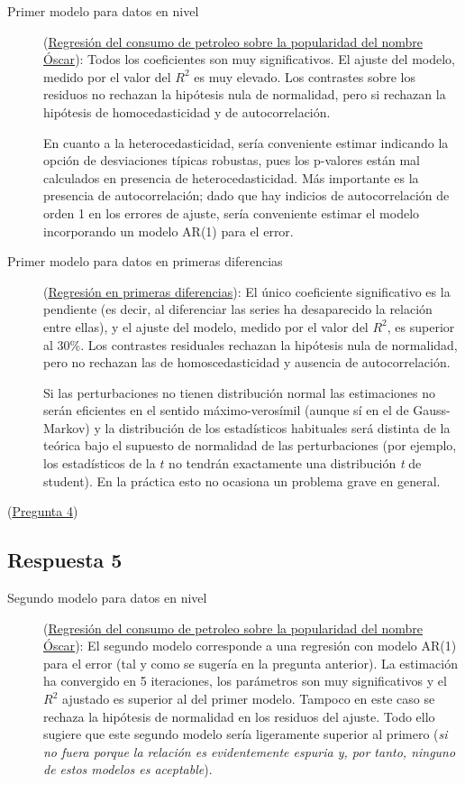 \documentclass[10pt]{article}
\begin{document}
\begin{description}
\item[{Primer modelo para datos en nivel}] (\hyperref[sec:orgd2adbd9]{Regresión del consumo de petroleo sobre la popularidad del nombre Óscar}): Todos los
coeficientes son muy significativos. El ajuste del modelo, medido
por el valor del \(R^2\) es muy elevado. Los contrastes sobre los
residuos no rechazan la hipótesis nula de normalidad, pero si
rechazan la hipótesis de homocedasticidad y de autocorrelación.

En cuanto a la heterocedasticidad, sería conveniente estimar
indicando la opción de desviaciones típicas robustas, pues los
p-valores están mal calculados en presencia de
heterocedasticidad. Más importante es la presencia de
autocorrelación; dado que hay indicios de autocorrelación de orden 1
en los errores de ajuste, sería conveniente estimar el modelo
incorporando un modelo AR(1) para el error.

\item[{Primer modelo para datos en primeras diferencias}] (\hyperref[sec:orge20fc9f]{Regresión en primeras diferencias}): El único coeficiente significativo es la
pendiente (es decir, al diferenciar las series ha desaparecido la
relación entre ellas), y el ajuste del modelo, medido por el valor
del \(R^2\), es superior al 30\%. Los contrastes residuales rechazan
la hipótesis nula de normalidad, pero no rechazan las de
homoscedasticidad y ausencia de autocorrelación.

Si las perturbaciones no tienen distribución normal las estimaciones
no serán eficientes en el sentido máximo-verosímil (aunque sí en el
de Gauss-Markov) y la distribución de los estadísticos habituales
será distinta de la teórica bajo el supuesto de normalidad de las
perturbaciones (por ejemplo, los estadísticos de la \(t\) no tendrán
exactamente una distribución \emph{t} de student). En la práctica esto no
ocasiona un problema grave en general.
\end{description}

(\hyperref[sec:org8e2fed6]{Pregunta 4})
\subsection*{Respuesta 5}
\label{sec:orgfe4b59b}


\begin{description}
\item[{Segundo modelo para datos en nivel}] (\hyperref[sec:orgd2adbd9]{Regresión del consumo de petroleo sobre la popularidad del nombre Óscar}): El segundo modelo
corresponde a una regresión con modelo AR(1) para el error (tal y
como se sugería en la pregunta anterior). La estimación ha
convergido en 5 iteraciones, los parámetros son muy significativos y
el \(R^2\) ajustado es superior al del primer modelo. Tampoco en este
caso se rechaza la hipótesis de normalidad en los residuos del
ajuste. Todo ello sugiere que este segundo modelo sería ligeramente
superior al primero (\emph{si no fuera porque la relación es
evidentemente espuria y, por tanto, ninguno de estos modelos es
aceptable}).
\end{description}
\end{document}
